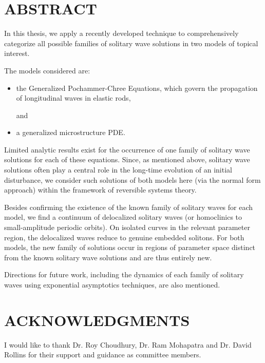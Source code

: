 \chapter*{ABSTRACT}

\indent 

In this thesis, we apply a recently developed technique to
comprehensively categorize all possible families of solitary wave
solutions in two models of topical interest.

The models considered are:
\begin{itemize}
\item the Generalized Pochammer-Chree Equations, which  govern the propagation of longitudinal waves in elastic rods,

and

\item a generalized microstructure PDE.
\end{itemize}

Limited analytic results exist for the occurrence of one family
of  solitary wave solutions for each of these equations. Since, as
mentioned above, solitary wave solutions often play a central role in
the long-time evolution of an initial disturbance, we consider
such solutions of both models here (via the normal form approach)
within the framework of reversible systems theory.

Besides confirming
the existence of the known family of solitary waves for each model,
we find a continuum of delocalized solitary waves
(or homoclinics to small-amplitude periodic orbits).
On isolated curves in the relevant parameter region, the delocalized
waves reduce to genuine embedded solitons.
For both models, the new family of solutions occur in regions of
parameter space distinct from the known solitary wave solutions and
are thus entirely new.

Directions for future work, including the dynamics of each family of
solitary waves using exponential asymptotics techniques, are also mentioned.



\dedication{
Dedicated To My Family
}



\newpage
{}
\chapter*{ACKNOWLEDGMENTS}

I would like to thank Dr. Roy Choudhury, Dr. Ram Mohapatra and Dr. David Rollins for their support and guidance as committee members.

\newpage
